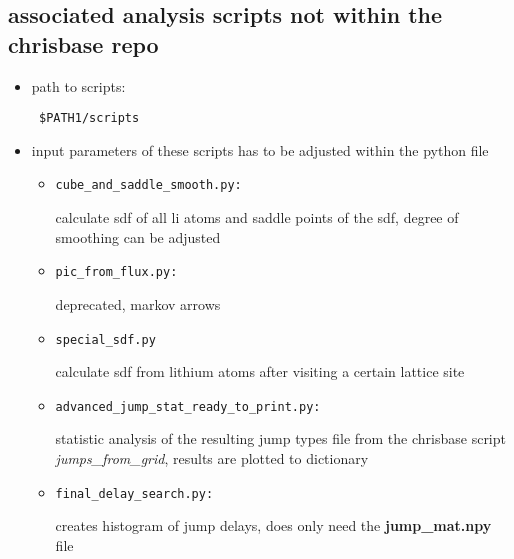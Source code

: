 \documentclass{article}
\begin{document}
\subsection{associated analysis scripts not within the chrisbase repo}
\begin{itemize}
%
 \item  path to scripts:
 \begin{verbatim}
 $PATH1/scripts
 \end{verbatim}
 \item input parameters of these scripts has to be adjusted within the python file  
%
 \begin{itemize}
 \item \begin{verbatim}cube_and_saddle_smooth.py:\end{verbatim} calculate sdf of all li atoms and saddle points of the sdf, degree of smoothing can be adjusted
\item \begin{verbatim}pic_from_flux.py:\end{verbatim} deprecated, markov arrows
\item \begin{verbatim}special_sdf.py\end{verbatim} calculate sdf from lithium atoms after visiting  a certain lattice site
\item \begin{verbatim}advanced_jump_stat_ready_to_print.py:\end{verbatim} statistic analysis of the resulting jump types file from the chrisbase script \textit{jumps\_from\_grid}, results are plotted to dictionary
\item \begin{verbatim}final_delay_search.py:\end{verbatim} creates histogram of jump delays, does only need the \textbf{jump\_mat.npy} file
%
\end{itemize}
\end{itemize}
\end{document}
